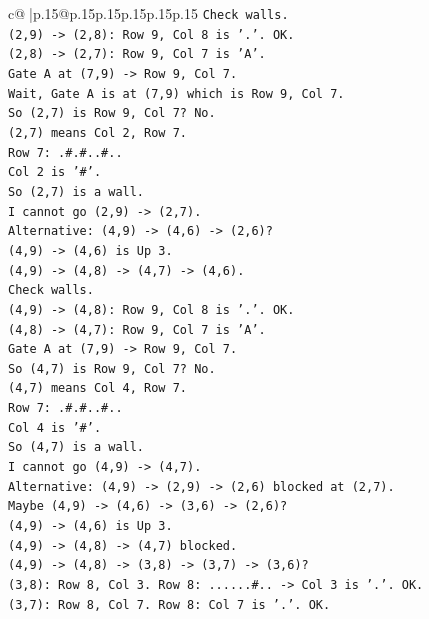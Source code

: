 \documentclass{article}
\begin{document}
{\begin{supertabular}{c@{$\;$}|p{.15\linewidth}@{}p{.15\linewidth}p{.15\linewidth}p{.15\linewidth}p{.15\linewidth}p{.15\linewidth}}
{{{\texttt{Check walls.} \\
\texttt{(2,9) {-}> (2,8): Row 9, Col 8 is '.'. OK.} \\
\texttt{(2,8) {-}> (2,7): Row 9, Col 7 is 'A'.} \\
\texttt{Gate A at (7,9) {-}> Row 9, Col 7.} \\
\texttt{Wait, Gate A is at (7,9) which is Row 9, Col 7.} \\
\texttt{So (2,7) is Row 9, Col 7? No.} \\
\texttt{(2,7) means Col 2, Row 7.} \\
\texttt{Row 7: .\#.\#..\#..} \\
\texttt{Col 2 is '\#'.} \\
\texttt{So (2,7) is a wall.} \\
\texttt{I cannot go (2,9) {-}> (2,7).} \\
\texttt{Alternative: (4,9) {-}> (4,6) {-}> (2,6)?} \\
\texttt{(4,9) {-}> (4,6) is Up 3.} \\
\texttt{(4,9) {-}> (4,8) {-}> (4,7) {-}> (4,6).} \\
\texttt{Check walls.} \\
\texttt{(4,9) {-}> (4,8): Row 9, Col 8 is '.'. OK.} \\
\texttt{(4,8) {-}> (4,7): Row 9, Col 7 is 'A'.} \\
\texttt{Gate A at (7,9) {-}> Row 9, Col 7.} \\
\texttt{So (4,7) is Row 9, Col 7? No.} \\
\texttt{(4,7) means Col 4, Row 7.} \\
\texttt{Row 7: .\#.\#..\#..} \\
\texttt{Col 4 is '\#'.} \\
\texttt{So (4,7) is a wall.} \\
\texttt{I cannot go (4,9) {-}> (4,7).} \\
\texttt{Alternative: (4,9) {-}> (2,9) {-}> (2,6) blocked at (2,7).} \\
\texttt{Maybe (4,9) {-}> (4,6) {-}> (3,6) {-}> (2,6)?} \\
\texttt{(4,9) {-}> (4,6) is Up 3.} \\
\texttt{(4,9) {-}> (4,8) {-}> (4,7) blocked.} \\
\texttt{(4,9) {-}> (4,8) {-}> (3,8) {-}> (3,7) {-}> (3,6)?} \\
\texttt{(3,8): Row 8, Col 3. Row 8: ......\#.. {-}> Col 3 is '.'. OK.} \\
\texttt{(3,7): Row 8, Col 7. Row 8: Col 7 is '.'. OK.} \\
}}}
\end{supertabular}}
\end{document}
